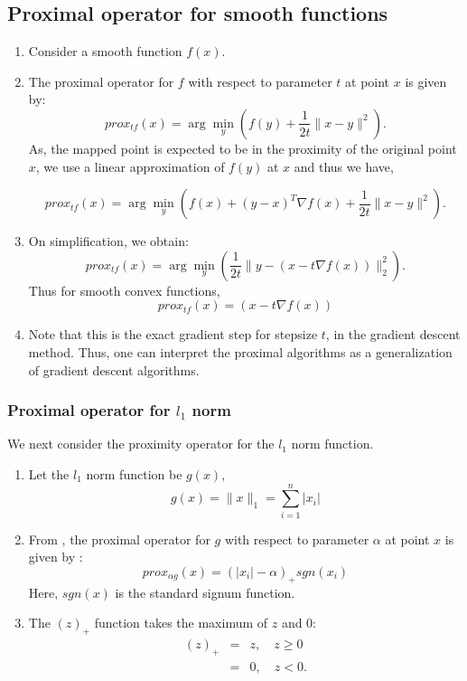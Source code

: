 \subsection{Proximal operator for smooth functions}


\begin{enumerate}
\item Consider a smooth function $f(x)$.
\item The proximal operator for $f$ with respect to parameter $t$ at point $x$ is given by:
\begin{equation}
 prox_{tf}(x) = \arg \min_y  \left( f(y) + \frac{1}{2t} \|x-y\|^2  \right).
\end{equation}
As, the mapped point is expected to be in the proximity of the original point $x$, we use a linear approximation of $f(y)$ at $x$  and thus we have,

\begin{equation}
 prox_{tf}(x) = \arg \min_y \left( f(x) + (y-x)^T \nabla f(x)  + \frac{1}{2t} \|x-y\|^2 \right).
\end{equation}
\item On simplification, we obtain:
\begin{equation}
 prox_{tf}(x) = \arg \min_y \left( \frac{1}{2t} \| y -  \left( x - t \nabla f(x) \right)  \|^2_2 \right).
\end{equation}
Thus for smooth convex functions, 
\begin{equation}
 prox_{tf}(x) = \left( x - t \nabla f(x) \right)
 \label{eq:prox}
\end{equation}
\item Note that this is the exact gradient step for stepsize $t$, in the gradient descent method.
Thus, one can interpret the proximal algorithms as a generalization of gradient descent algorithms.
\end{enumerate}

\subsubsection{Proximal operator for $l_1$ norm}
We next consider the proximity operator for the $l_1$ norm function. 
\begin{enumerate}
\item Let the $l_1$ norm function be $g(x)$,
\begin{equation}
 g(x) = \| x \|_1 = \sum_{i=1}^n |x_i|
\end{equation}
\item From \cite{prox_book}, the proximal operator for $g$ with respect to parameter $\alpha$ at point $x$ is given by :
\begin{equation}
 prox_{\alpha g}(x) = (|x_i| - \alpha)_+ sgn(x_i)
\end{equation}
Here, $sgn(x)$ is the standard signum function. 
\item The $(z)_+$ function takes the maximum of $z$ and 0:
\begin{eqnarray}
 (z)_+ &=& z, \quad z \geq 0 \\
       &=& 0,  \quad z < 0.
\end{eqnarray}
\end{enumerate}




